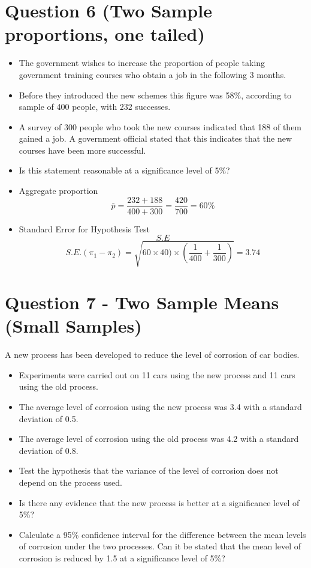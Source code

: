 \documentclass[a4paper,12pt]{article}
\begin{document}
\section*{Question 6 (Two Sample proportions, one tailed)}
\begin{itemize}
\item The government wishes to increase the proportion of people taking government training courses who obtain a job in the following 3 months. \item Before they introduced the new schemes this figure was 58\%, according to sample of 400 people, with 232 successes. \item A survey of 300 people who took the new courses indicated that 188 of them gained a job. A government official stated that this indicates that the new courses have been more successful. \item Is this statement reasonable at a significance level of 5\%?
\end{itemize}


\begin{itemize}
\item Aggregate proportion
\[ \bar{p} = \frac{232 + 188}{400+300} = \frac{420}{700} =60\%\]
\item Standard Error for Hypothesis Test
\[S.E\]\[ S.E.(\pi_1 - \pi_2)  = \sqrt{60 \times 40) \times \left( \frac{1}{400} + \frac{1}{300}\right)}  = 3.74\]

\end{itemize}
\newpage
\section*{Question 7 - Two Sample Means (Small Samples)}
A new process has been developed to reduce the level of corrosion of car bodies.
\begin{itemize}
\item Experiments were carried out on 11 cars using the new process and 11 cars using the old process. \item The average level of corrosion using the new process was 3.4 with a standard deviation of 0.5. \item The average level of corrosion using the old process was 4.2 with a standard deviation of 0.8. 
\end{itemize} 

\begin{itemize}
\item  Test the hypothesis that the variance of the level of corrosion does not depend on the process used.
\item  Is there any evidence that the new process is better at a significance level of 5\%?
\item  Calculate a 95\% confidence interval for the difference between the mean levels of corrosion under the two processes. Can it be stated that the mean level of corrosion is reduced by 1.5 at a significance level of 5\%? 
\end{itemize}
\end{document}
